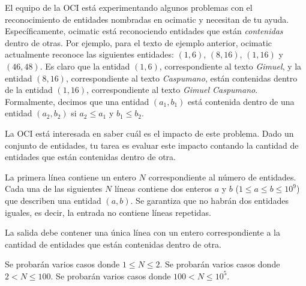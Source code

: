 \documentclass{oci}
\begin{document}
\begin{problemDescription}
El equipo de la OCI está experimentando algunos problemas con el reconocimiento de
entidades nombradas en ocimatic y necesitan de tu ayuda.
Específicamente, ocimatic está reconociendo entidades que están \emph{contenidas}
dentro de otras.
Por ejemplo, para el texto de ejemplo anterior, ocimatic actualmente reconoce las
siguientes entidades: $(1, 6)$, $(8, 16)$, $(1, 16)$ y $(46, 48)$.
Es claro que la entidad $(1, 6)$, correspondiente al texto \emph{Gimuel}, y la
entidad $(8, 16)$, correspondiente al texto \emph{Caspumano}, están
contenidas dentro de la entidad $(1, 16)$, correspondiente al texto \emph{Gimuel
  Caspumano}.
Formalmente, decimos que una entidad $(a_1,b_1)$ está contenida dentro de una
entidad $(a_2,b_2)$ si $a_2\leq a_1$ y $b_1\leq b_2$.

La OCI está interesada en saber cuál es el impacto de este problema.
Dado un conjunto de entidades, tu tarea es evaluar este impacto contando la
cantidad de entidades que están contenidas dentro de otra.
\end{problemDescription}

\begin{inputDescription}
  La primera línea contiene un entero $N$ correspondiente al número de entidades.
  Cada una de las siguientes $N$ líneas contiene dos enteros $a$ y $b$ ($1\leq
  a\leq b \leq 10^9$) que describen una entidad $(a,b)$.
  Se garantiza que no habrán dos entidades iguales, es decir, la entrada no
  contiene líneas repetidas.
\end{inputDescription}

\begin{outputDescription}
  La salida debe contener una única línea con un entero correspondiente a la cantidad de
  entidades que están contenidas dentro de otra.
\end{outputDescription}

\begin{scoreDescription}
   Se probarán varios casos donde $1\leq N\leq 2$.
   Se probarán varios casos donde $2< N \leq 100$.
   Se probarán varios casos donde $100< N \leq 10^5$.
\end{scoreDescription}

\begin{sampleDescription}
\end{sampleDescription}
\end{document}
